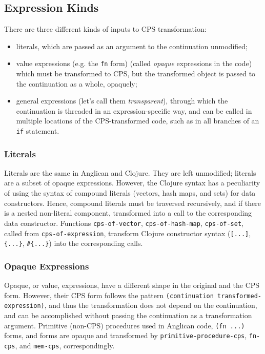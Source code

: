 \documentclass[preprint]{sigplanconf}
\begin{document}
\subsection{Expression Kinds}

There are three different kinds of inputs to CPS transformation:
\begin{itemize}
    \item literals, which are passed as an argument to the
        continuation unmodified;
    \item value expressions (e.g. the \texttt{fn} form) 
        (called \textit{opaque}
        expressions in the code) which must be transformed to
        CPS, but the transformed object is passed to the
        continuation as a whole, opaquely;
    \item general expressions (let's call them
        \textit{transparent}), through which the continuation is
        threaded in an expression-specific way, and can be
        called in multiple locations of the CPS-transformed
        code, such as in all branches of an \texttt{if}
        statement.
\end{itemize}

\subsubsection{Literals}

Literals are the same in Anglican and Clojure. They are 
left unmodified; literals are a subset of opaque expressions.
However, the Clojure syntax has a peculiarity
of using the syntax of compound literals (vectors, hash maps,
and sets) for data constructors. Hence, compound literals must
be traversed recursively, and if there is a nested non-literal
component, transformed into a call to the corresponding data
constructor. Functions \texttt{cps-of-vector},
\texttt{cps-of-hash-map}, \texttt{cps-of-set}, called from
\texttt{cps-of-expression}, transform Clojure constructor syntax
(\texttt{[...]}, \texttt{\{...\}}, \texttt{\#\{...\}}) into the
corresponding calls.

\subsubsection{Opaque Expressions}

Opaque, or value, expressions, have a different shape in the
original and the CPS form. However, their CPS form follows the
pattern \texttt{(continuation transformed-expression)}, and thus
the transformation does not depend on the continuation, and
can be accomplished without passing the continuation as a
transformation argument. Primitive (non-CPS) procedures used in
Anglican code, \texttt{(fn ...)} forms, and 
forms are opaque and transformed by
\texttt{primitive-}\linebreak[0]\texttt{procedure-}\linebreak[0]\texttt{cps}, \texttt{fn-cps}, and
\texttt{mem-cps}, correspondingly.
\end{document}
